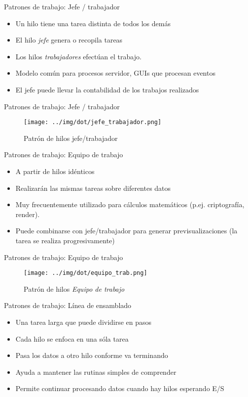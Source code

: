 \documentclass[presentation]{beamer}
\begin{document}
\begin{frame}[label={sec:org9a0f4ab}]{Patrones de trabajo: Jefe / trabajador}
\begin{itemize}
\item Un hilo tiene una tarea distinta de todos los demás
\item El hilo \emph{jefe} genera o recopila tareas
\item Los hilos \emph{trabajadores} efectúan el trabajo.
\item Modelo común para procesos servidor, GUIs que procesan eventos
\item El jefe puede llevar la contabilidad de los trabajos realizados
\end{itemize}
\end{frame}
\begin{frame}[label={sec:orga644299}]{Patrones de trabajo: Jefe / trabajador}
\begin{figure}[htbp]
\centering
\texttt{[image: ../img/dot/jefe\_trabajador.png]}
\caption{Patrón de hilos jefe/trabajador}
\end{figure}
\end{frame}

\begin{frame}[label={sec:orgf0e7675}]{Patrones de trabajo: Equipo de trabajo}
\begin{itemize}
\item A partir de hilos idénticos
\item Realizarán las mismas tareas sobre diferentes datos
\item Muy frecuentemente utilizado para cálculos matemáticos
(p.ej. criptografía, render).
\item Puede combinarse con jefe/trabajador para generar
previsualizaciones (la tarea se realiza progresivamente)
\end{itemize}
\end{frame}

\begin{frame}[label={sec:org9b110c3}]{Patrones de trabajo: Equipo de trabajo}
\begin{figure}[htbp]
\centering
\texttt{[image: ../img/dot/equipo\_trab.png]}
\caption{Patrón de hilos \emph{Equipo de trabajo}}
\end{figure}
\end{frame}

\begin{frame}[label={sec:orgfd7ad1e}]{Patrones de trabajo: Línea de ensamblado}
\begin{itemize}
\item Una tarea larga que puede dividirse en pasos
\item Cada hilo se enfoca en una sóla tarea
\item Pasa los datos a otro hilo conforme va terminando
\item Ayuda a mantener las rutinas simples de comprender
\item Permite continuar procesando datos cuando hay hilos esperando E/S
\end{itemize}
\end{frame}
\end{document}
